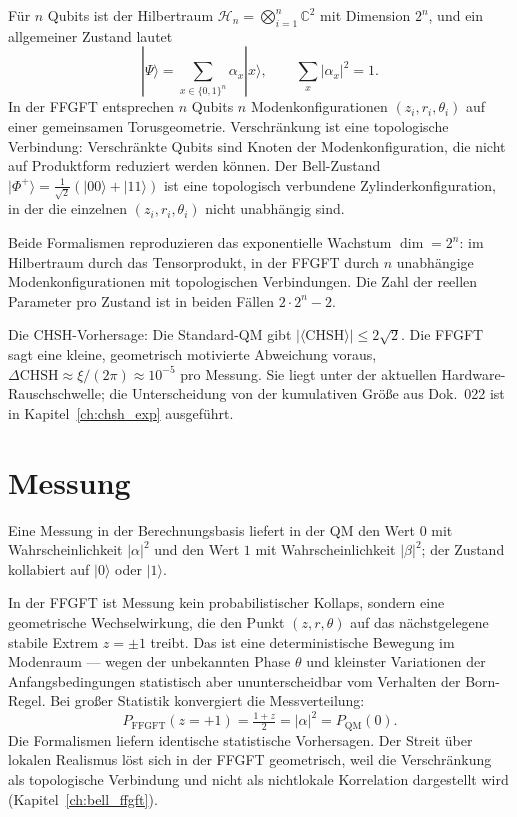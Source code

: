 Für $n$ Qubits ist der Hilbertraum
$\mathcal{H}_n = \bigotimes_{i=1}^n\mathbb{C}^2$ mit Dimension $2^n$,
und ein allgemeiner Zustand lautet
\begin{equation}
  |\Psi\rangle = \sum_{x\in\{0,1\}^n}\alpha_x|x\rangle,\qquad
  \sum_x|\alpha_x|^2 = 1.
\end{equation}
In der FFGFT entsprechen $n$ Qubits $n$ Modenkonfigurationen
$(z_i,r_i,\theta_i)$ auf einer gemeinsamen Torusgeometrie. Verschränkung
ist eine topologische Verbindung: Verschränkte Qubits sind Knoten der
Modenkonfiguration, die nicht auf Produktform reduziert werden können.
Der Bell-Zustand $|\Phi^+\rangle = \frac{1}{\sqrt2}(|00\rangle+|11\rangle)$
ist eine topologisch verbundene Zylinderkonfiguration, in der die
einzelnen $(z_i,r_i,\theta_i)$ nicht unabhängig sind.

Beide Formalismen reproduzieren das exponentielle Wachstum $\dim = 2^n$:
im Hilbertraum durch das Tensorprodukt, in der FFGFT durch $n$
unabhängige Modenkonfigurationen mit topologischen Verbindungen. Die
Zahl der reellen Parameter pro Zustand ist in beiden Fällen $2\cdot2^n-2$.

Die CHSH-Vorhersage: Die Standard-QM gibt $|\langle\mathrm{CHSH}\rangle|
\le2\sqrt2$. Die FFGFT sagt eine kleine, geometrisch motivierte Abweichung
voraus, $\Delta\mathrm{CHSH}\approx\xi/(2\pi)\approx10^{-5}$ pro
Messung. Sie liegt unter der aktuellen Hardware-Rauschschwelle;
die Unterscheidung von der kumulativen Größe aus Dok.~022 ist in
Kapitel~\ref{ch:chsh_exp} ausgeführt.

\section{Messung}

Eine Messung in der Berechnungsbasis liefert in der QM den Wert $0$ mit
Wahrscheinlichkeit $|\alpha|^2$ und den Wert $1$ mit Wahrscheinlichkeit
$|\beta|^2$; der Zustand kollabiert auf $|0\rangle$ oder $|1\rangle$.

In der FFGFT ist Messung kein probabilistischer Kollaps, sondern eine
geometrische Wechselwirkung, die den Punkt $(z,r,\theta)$ auf das
nächstgelegene stabile Extrem $z = \pm1$ treibt. Das ist eine
deterministische Bewegung im Modenraum --- wegen der unbekannten Phase
$\theta$ und kleinster Variationen der Anfangsbedingungen statistisch
aber ununterscheidbar vom Verhalten der Born-Regel. Bei großer Statistik
konvergiert die Messverteilung:
\begin{equation}
  P_{\mathrm{FFGFT}}(z = +1) = \tfrac{1+z}{2} = |\alpha|^2 = P_{\mathrm{QM}}(0).
\end{equation}
Die Formalismen liefern identische statistische Vorhersagen.
Der Streit über lokalen Realismus löst sich in der FFGFT geometrisch,
weil die Verschränkung als topologische Verbindung und nicht als
nichtlokale Korrelation dargestellt wird (Kapitel~\ref{ch:bell_ffgft}).

